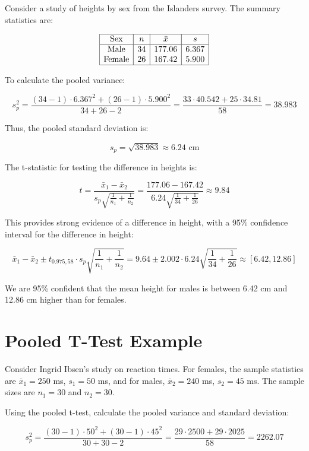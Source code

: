 \documentclass{article}
\begin{document}
Consider a study of heights by sex from the Islanders survey. The summary statistics are:

\[
\begin{array}{|c|c|c|c|}
\hline
\text{Sex} & n & \bar{x} & s \\
\hline
\text{Male} & 34 & 177.06 & 6.367 \\
\text{Female} & 26 & 167.42 & 5.900 \\
\hline
\end{array}
\]

To calculate the pooled variance:

\[
s_p^2 = \frac{(34 - 1) \cdot 6.367^2 + (26 - 1) \cdot 5.900^2}{34 + 26 - 2} = \frac{33 \cdot 40.542 + 25 \cdot 34.81}{58} = 38.983
\]

Thus, the pooled standard deviation is:

\[
s_p = \sqrt{38.983} \approx 6.24 \text{ cm}
\]

The t-statistic for testing the difference in heights is:

\[
t = \frac{\bar{x}_1 - \bar{x}_2}{s_p \sqrt{\frac{1}{n_1} + \frac{1}{n_2}}} = \frac{177.06 - 167.42}{6.24 \sqrt{\frac{1}{34} + \frac{1}{26}}} \approx 9.84
\]

This provides strong evidence of a difference in height, with a 95\% confidence interval for the difference in height:

\[
\bar{x}_1 - \bar{x}_2 \pm t_{0.975, 58} \cdot s_p \sqrt{\frac{1}{n_1} + \frac{1}{n_2}} = 9.64 \pm 2.002 \cdot 6.24 \sqrt{\frac{1}{34} + \frac{1}{26}} \approx [6.42, 12.86]
\]

We are 95\% confident that the mean height for males is between 6.42 cm and 12.86 cm higher than for females.

\section*{Pooled T-Test Example}

Consider Ingrid Ibsen's study on reaction times. For females, the sample statistics are \( \bar{x}_1 = 250 \) ms, \( s_1 = 50 \) ms, and for males, \( \bar{x}_2 = 240 \) ms, \( s_2 = 45 \) ms. The sample sizes are \( n_1 = 30 \) and \( n_2 = 30 \).

Using the pooled t-test, calculate the pooled variance and standard deviation:

\[
s_p^2 = \frac{(30 - 1) \cdot 50^2 + (30 - 1) \cdot 45^2}{30 + 30 - 2} = \frac{29 \cdot 2500 + 29 \cdot 2025}{58} = 2262.07
\]
\end{document}
